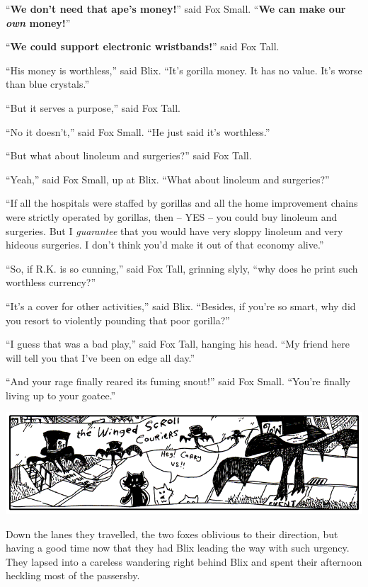 \documentclass[10pt,twoside]{report}
\begin{document}
``{\bf We don't need that ape's money!}'' said Fox Small.  ``{\bf We
  can make our {\em own} money!}''

``{\bf We could support electronic wristbands!}'' said Fox Tall.

``His money is worthless,'' said Blix.  ``It's gorilla money.  It has
no value.  It's worse than blue crystals.''

``But it serves a purpose,'' said Fox Tall.

``No it doesn't,'' said Fox Small.  ``He just said it's worthless.''

``But what about linoleum and surgeries?'' said Fox Tall.

``Yeah,'' said Fox Small, up at Blix.  ``What about linoleum and
surgeries?''

``If all the hospitals were staffed by gorillas and all the home
improvement chains were strictly operated by gorillas, then -- YES --
you could buy linoleum and surgeries.  But I {\em guarantee} that you
would have very sloppy linoleum and very hideous surgeries.  I don't
think you'd make it out of that economy alive.''

``So, if R.K. is so cunning,'' said Fox Tall, grinning slyly, ``why
does he print such worthless currency?''

``It's a cover for other activities,'' said Blix.  ``Besides, if
you're so smart, why did you resort to violently pounding that poor
gorilla?''

``I guess that was a bad play,'' said Fox Tall, hanging his head.
``My friend here will tell you that I've been on edge all day.''

``And your rage finally reared its fuming snout!'' said Fox Small.
``You're finally living up to your goatee.''

	\includegraphics[width=1.0\textwidth]{cache/73.png}

Down the lanes they travelled, the two foxes oblivious to their
direction, but having a good time now that they had Blix leading the
way with such urgency.  They lapsed into a careless wandering right
behind Blix and spent their afternoon heckling most of the passersby.
\end{document}
